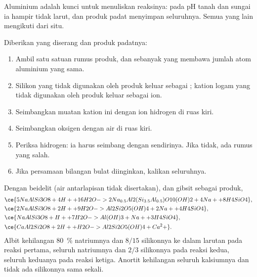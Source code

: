 Aluminium adalah kunci untuk menuliskan reaksinya: pada pH tanah dan sungai ia hampir tidak larut, dan produk padat menyimpan seluruhnya. Semua yang lain mengikuti dari situ.

\begin{method}\label{met:b1:weathering-clays:balance}
Diberikan  yang diserang dan produk padatnya:
\begin{enumerate}
  \item Ambil satu satuan rumus produk, dan sebanyak  yang membawa jumlah atom aluminium yang sama.
  \item Silikon  yang tidak digunakan oleh produk keluar sebagai ; kation logam yang tidak digunakan oleh produk keluar sebagai ion.
  \item Seimbangkan muatan kation ini dengan ion hidrogen di ruas kiri.
  \item Seimbangkan oksigen dengan air di ruas kiri.
  \item Periksa hidrogen: ia harus seimbang dengan sendirinya. Jika tidak, ada rumus yang salah.
  \item Jika persamaan bilangan bulat diinginkan, kalikan seluruhnya.
\end{enumerate}
\end{method}

\begin{proposition}\label{prop:b1:weathering-clays:feldspars}
Dengan  beidelit 
(air antarlapisan tidak disertakan),   dan gibsit
 sebagai produk,
\begin{align*}
&\ce{5 NaAlSi3O8 + 4 H+ + 16 H2O -> 2 Na_{0.5}Al2(Si_{3.5}Al_{0.5})O10(OH)2 + 4 Na+ + 8 H4SiO4},\\ %
&\ce{2 NaAlSi3O8 + 2 H+ + 9 H2O -> Al2Si2O5(OH)4 + 2 Na+ + 4 H4SiO4},\\
&\ce{NaAlSi3O8 + H+ + 7 H2O -> Al(OH)3 + Na+ + 3 H4SiO4},\\
&\ce{CaAl2Si2O8 + 2 H+ + H2O -> Al2Si2O5(OH)4 + Ca^2+}.
\end{align*}
Albit kehilangan \qty{80}{\percent} natriumnya dan $8/15$ silikonnya ke dalam larutan pada reaksi pertama, seluruh natriumnya dan $2/3$ silikonnya pada reaksi kedua, seluruh keduanya pada reaksi ketiga. Anortit kehilangan seluruh kalsiumnya dan tidak ada silikonnya sama sekali.
\end{proposition}

